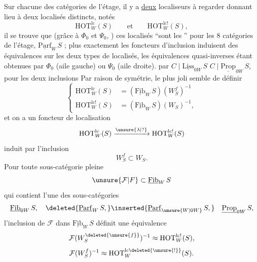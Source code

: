 Sur chacune des catégories de l'étage, il y a
\uline{deux} localiseurs à regarder
donnant lieu à deux localisés distincts, notés
\[
\mathrm{HOT}_W^{\mathrm{lc}}(S)\qquad\text{et}\qquad\mathrm{HOT}_W^{\mathrm{lc}!}(S),
\]
il se trouve que (grâce à $\Phi_0$ et $\Psi_0$, ) ces localisés
``sont les '' pour les 8 catégories de l'étage,
 $\underline{\mathrm{Parf}}_W\,S$ ; plus exactement les foncteurs
d'inclusion 
induisent des équivalences sur les
deux types de localisés, les équivalences quasi-inverses étant obtenues par $\Phi_0$ (aile gauche) ou
$\Psi_0$ (aile droite). 
 par $C\mid\underline{\mathrm{Liss}}_{0W}\,S$
$C\mid\underline{\mathrm{Prop}}_{0W}\,S$, pour les deux inclusions
Par raison de symétrie, le plus joli semble de
définir
\[
\left\{\begin{aligned}
\mathrm{HOT}_W^{\mathrm{lc}}(S)&=(\underline{\mathrm{Fib}}_W\,S)(W_S^f)^{-1}\\
\mathrm{HOT}_W^{\mathrm{lc}!}(S)&=(\underline{\mathrm{Fib}}_W\,S)(W_S)^{-1},
\end{aligned}\right.
\]
et on a un foncteur de localisation
\[
\mathrm{HOT}_W^{\mathrm{lc}}(S)\xrightarrow{\unsure{\lambda|{?}}}\mathrm{HOT}_W^{\mathrm{lc}!}(S)
\]
induit par l'inclusion
\[
W_S^f\subset W_S .
\]
Pour toute sous-catégorie pleine
\[
\unsure{\mathcal{F}|F}\subset\underline{\mathrm{Fib}}_W\,S
\]
qui contient l'une des  sous-catégories
\[
\underline{\mathrm{Fib}}_{0W}\,S,\quad \deleted{\underline{\mathrm{Parf}}_W\,S,}\inserted{\underline{\mathrm{Parf}}_{\unsure{W|0W}}\,S,}
\quad\underline{\mathrm{Prop}}_{0W}\,S,
\]
l'inclusion de $\mathcal{F}$ dans $\underline{\mathrm{Fib}}_W\,S$ définit une équivalence
\[
\mathcal{F}(W_S^{\deleted{\unsure{f}}})^{-1}\approx\mathrm{HOT}_W^{\mathrm{lc}!}(S),
\]
\[
\mathcal{F}(W_S^f)^{-1}\approx\mathrm{HOT}_W^{\mathrm{lc}\deleted{\unsure{!}}}(S).
\]

